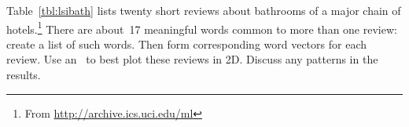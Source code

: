 \begin{exercise} \label{ex:lsibath} 
Table~\ref{tbl:lsibath} lists twenty short reviews about bathrooms of a major chain of hotels.\footnote{From \protect\url{http://archive.ics.uci.edu/ml}}
There are about~17 meaningful words common to more than one review: create a list of such words.
Then form corresponding word vectors for each review.
Use an \svd\ to best plot these reviews in 2D.
Discuss any patterns in the results.
\end{exercise}

\endinput%

